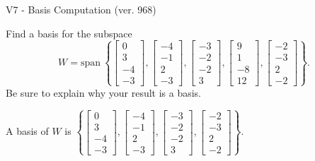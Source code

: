 \begin{exercise}
  \begin{exerciseTitle}V7 - Basis Computation (ver. 968)\end{exerciseTitle}
  \begin{exerciseStatement}
    Find a basis for the subspace 
\[W=\mathrm{span}\ \left\{\left[\begin{array}{r}
0 \\
3 \\
-4 \\
-3
\end{array}\right] , \left[\begin{array}{r}
-4 \\
-1 \\
2 \\
-3
\end{array}\right] , \left[\begin{array}{r}
-3 \\
-2 \\
-2 \\
3
\end{array}\right] , \left[\begin{array}{r}
9 \\
1 \\
-8 \\
12
\end{array}\right] , \left[\begin{array}{r}
-2 \\
-3 \\
2 \\
-2
\end{array}\right]\right\}.\]
 Be sure to explain why your result is a basis.


  \end{exerciseStatement}
  \begin{exerciseAnswer}
   A basis of \(W\) is  \(\left\{\left[\begin{array}{r}
0 \\
3 \\
-4 \\
-3
\end{array}\right] , \left[\begin{array}{r}
-4 \\
-1 \\
2 \\
-3
\end{array}\right] , \left[\begin{array}{r}
-3 \\
-2 \\
-2 \\
3
\end{array}\right] , \left[\begin{array}{r}
-2 \\
-3 \\
2 \\
-2
\end{array}\right]\right\}\).
  


  \end{exerciseAnswer}
\end{exercise}